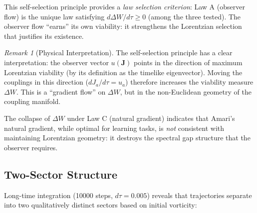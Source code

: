 \documentclass[11pt]{article}
\theoremstyle{definition}
\theoremstyle{remark}
\newtheorem{remark}[theorem]{Remark}
\newcommand{\obs}{u}
\newcommand{\coupl}{\mathbf{J}}
\begin{document}
This self-selection principle provides a \emph{law selection criterion}:
Law A (observer flow) is the unique law satisfying $d\Delta W/d\tau \geq 0$
(among the three tested). The observer flow ``earns'' its own viability:
it strengthens the Lorentzian selection that justifies its existence.

\begin{remark}[Physical Interpretation]
The self-selection principle has a clear interpretation: the observer
vector $\obs(\coupl)$ points in the direction of maximum Lorentzian
viability (by its definition as the timelike eigenvector). Moving the
couplings in this direction ($dJ_a/d\tau = \obs_a$) therefore increases
the viability measure $\Delta W$. This is a ``gradient flow'' on $\Delta W$,
but in the non-Euclidean geometry of the coupling manifold.

The collapse of $\Delta W$ under Law C (natural gradient) indicates that
Amari's natural gradient, while optimal for learning tasks, is \emph{not}
consistent with maintaining Lorentzian geometry: it destroys the spectral
gap structure that the observer requires.
\end{remark}

\subsection{Two-Sector Structure}
\label{subsec:two-sectors}

Long-time integration (10000 steps, $d\tau = 0.005$) reveals that
trajectories separate into two qualitatively distinct sectors based
on initial vorticity:
\end{document}
